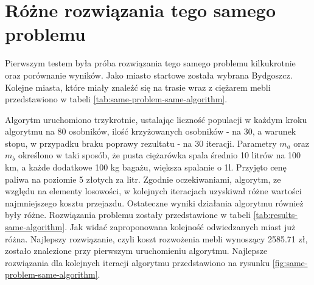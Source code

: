 \documentclass[12pt, oneside, final]{report}
\begin{document}
\section{Różne rozwiązania tego samego problemu}
Pierwszym testem była próba rozwiązania tego samego problemu kilkukrotnie oraz porównanie wyników. Jako miasto startowe została wybrana Bydgoszcz. Kolejne miasta, które miały znaleźć się na trasie wraz z ciężarem mebli przedstawiono w tabeli \ref{tab:same-problem-same-algorithm}.

\begin{table}[ht!]
\caption{Definicja problemu do rozwiązania w pierwszym teście}
\label{tab:same-problem-same-algorithm}
\centering
{}
\end{table}

Algorytm uruchomiono trzykrotnie, ustalając liczność populacji w każdym kroku algorytmu na 80 osobników, ilość krzyżowanych osobników - na 30, a warunek stopu, w przypadku braku poprawy rezultatu - na 30 iteracji. Parametry $m_a$ oraz $m_b$ określono w taki sposób, że pusta ciężarówka spala średnio 10 litrów na 100 km, a każde dodatkowe 100 kg bagażu, większa spalanie o 1l. Przyjęto cenę paliwa na poziomie 5 złotych za litr. Zgodnie oczekiwaniami, algorytm, ze względu na elementy losowości, w kolejnych iteracjach uzyskiwał różne wartości najmniejszego kosztu przejazdu. Ostateczne wyniki działania algorytmu również były różne. Rozwiązania problemu zostały przedstawione w tabeli \ref{tab:results-same-algorithm}. Jak widać zaproponowana kolejność odwiedzanych miast już różna. Najlepszy rozwiązanie, czyli koszt rozwożenia mebli wynoszący 2585.71 zł, zostało znalezione przy pierwszym uruchomieniu algorytmu. Najlepsze rozwiązania dla kolejnych iteracji algorytmu przedstawiono na rysunku \ref{fig:same-problem-same-algorithm}.
\end{document}
